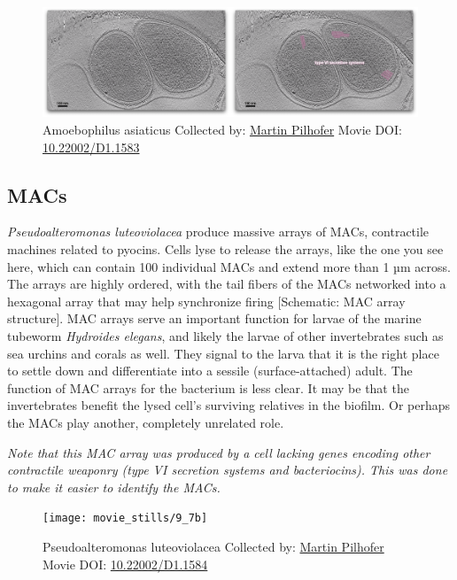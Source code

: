\documentclass[]{tufte-book}
\begin{document}
\begin{figure}
\includegraphics{movie_stills/9_7a} \caption[Amoebophilus asiaticus Collected by:
\protect\hyperlink{martin_pilhofer}{Martin Pilhofer} Movie DOI:
\href{https://doi.org/10.22002/D1.1583}{10.22002/D1.1583}]{Amoebophilus asiaticus Collected by:
\protect\hyperlink{martin_pilhofer}{Martin Pilhofer} Movie DOI:
\href{https://doi.org/10.22002/D1.1583}{10.22002/D1.1583}}\label{fig:9-7a}
\end{figure}

\hypertarget{MACs}{\subsection{MACs}\label{MACs}}

\emph{Pseudoalteromonas luteoviolacea} produce massive arrays of MACs,
contractile machines related to pyocins. Cells lyse to release the
arrays, like the one you see here, which can contain 100 individual MACs
and extend more than 1 µm across. The arrays are highly ordered, with
the tail fibers of the MACs networked into a hexagonal array that may
help synchronize firing {[}Schematic: MAC array structure{]}. MAC arrays
serve an important function for larvae of the marine tubeworm
\emph{Hydroides elegans}, and likely the larvae of other invertebrates
such as sea urchins and corals as well. They signal to the larva that it
is the right place to settle down and differentiate into a sessile
(surface-attached) adult. The function of MAC arrays for the bacterium
is less clear. It may be that the invertebrates benefit the lysed cell's
surviving relatives in the biofilm. Or perhaps the MACs play another,
completely unrelated role.

\emph{Note that this MAC array was produced by a cell lacking genes
encoding other contractile weaponry (type VI secretion systems and
bacteriocins). This was done to make it easier to identify the MACs.}





\begin{figure}
\texttt{[image: movie\_stills/9\_7b]} \caption[Pseudoalteromonas luteoviolacea Collected by:
\protect\hyperlink{martin_pilhofer}{Martin Pilhofer} Movie DOI:
\href{https://doi.org/10.22002/D1.1584}{10.22002/D1.1584}]{Pseudoalteromonas luteoviolacea Collected by:
\protect\hyperlink{martin_pilhofer}{Martin Pilhofer} Movie DOI:
\href{https://doi.org/10.22002/D1.1584}{10.22002/D1.1584}}\label{fig:9-7b}
\end{figure}
\end{document}
